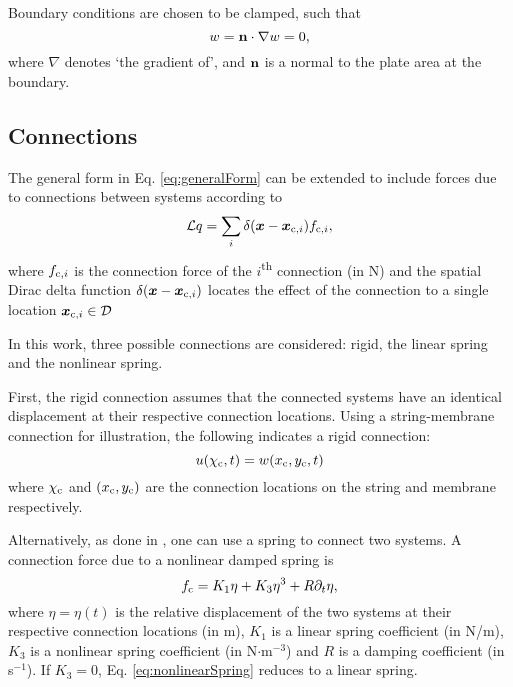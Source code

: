\documentclass{article}
\begin{document}
Boundary conditions are chosen to be clamped, such that
\begin{equation}
        w = {\bf n} \cdot \nabla w = 0,
\end{equation}
where $\nabla$ denotes `the gradient of', and ${\bf n}$ is a normal to the plate area at the boundary.

\subsection{Connections}
The general form in Eq. \eqref{eq:generalForm} can be extended to include forces due to connections between systems according to
\begin{equation}\label{eq:generalFormConnections}
    \mathcal{L}q = \sum_i \delta(\boldsymbol{x} - \boldsymbol{x}_{\text{c}, i})f_{\text{c}, i},
\end{equation}
where $f_{\text{c}, i}$ is the connection force of the $i$\textsuperscript{th} connection (in N) and the spatial Dirac delta function $\delta(\boldsymbol{x}-\boldsymbol{x}_{\text{c}, i})$ locates the effect of the connection to a single location $\boldsymbol{x}_{\text{c}, i}\in \mathcal{D}$
 
In this work, three possible connections are considered: rigid, the linear spring and the nonlinear spring. 

First, the rigid connection assumes that the connected systems have an identical displacement at their respective connection locations. Using a string-membrane connection for illustration, the following indicates a rigid connection: 
\begin{equation}
    u(\chi_{\text{c}}, t) = w(x_{\text{c}}, y_{\text{c}}, t)
\end{equation}
where $\chi_{\text{c}}$ and $(x_{\text{c}}, y_{\text{c}})$ are the connection locations on the string and membrane respectively. 

Alternatively, as done in \cite{theBible, Bilbao2009Modular}, one can use a spring to connect two systems. A connection force due to a nonlinear damped spring is
\begin{equation}\label{eq:nonlinearSpring}
    f_{\text{c}} = K_1\eta + K_3\eta^3 + R\partial_t \eta,
\end{equation}
where $\eta = \eta(t)$ is the relative displacement of the two systems at their respective connection locations (in m), $K_1$ is a linear spring coefficient (in N/m), $K_3$ is a nonlinear spring coefficient (in N$\cdot$m$^{-3}$) and $R$ is a damping coefficient (in s$^{-1}$). If $K_3 = 0$, Eq. \eqref{eq:nonlinearSpring} reduces to a linear spring. 
\end{document}
